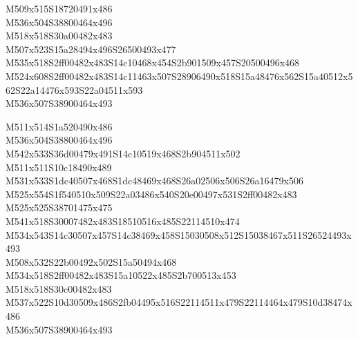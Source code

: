 \documentclass{article}
\begin{document}
\begin{multicols}{5}
\begin{center}

M509x515S18720491x486 %
\\M536x504S38800464x496 %
\\M518x518S30a00482x483 %
\\M507x523S15a28494x496S26500493x477 %
\\M535x518S2ff00482x483S14c10468x454S2b901509x457S20500496x468 %
\\M524x608S2ff00482x483S14c11463x507S28906490x518S15a48476x562S15a40512x562S22a14476x593S22a04511x593 %
\\M536x507S38900464x493 %
\vfil
\columnbreak

M511x514S1a520490x486 %
\\M536x504S38800464x496 %
\\M542x533S36d00479x491S14c10519x468S2b904511x502 %
\\M511x511S10c18490x489 %
\\M531x533S1dc40507x468S1dc48469x468S26a02506x506S26a16479x506 %
\\M525x554S1f540510x509S22a03486x540S20e00497x531S2ff00482x483 %
\\M525x525S38701475x475 %
\\M541x518S30007482x483S18510516x485S22114510x474 %
\\M534x543S14c30507x457S14c38469x458S15030508x512S15038467x511S26524493x493 %
\\M508x532S22b00492x502S15a50494x468 %
\\M534x518S2ff00482x483S15a10522x485S2b700513x453 %
\\M518x518S30c00482x483 %
\\M537x522S10d30509x486S2fb04495x516S22114511x479S22114464x479S10d38474x486 %
\\M536x507S38900464x493 %
\vfil
\columnbreak


\end{center}
\end{multicols}
\end{document}
